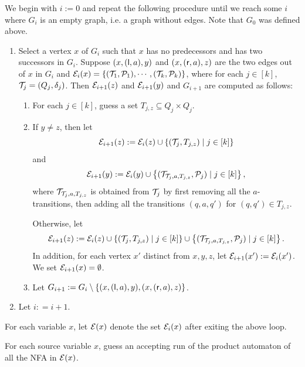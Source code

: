 We begin with $i:= 0$ and repeat the following procedure until we reach some $i$ where $G_i$ is an empty graph, i.e. a graph without edges.
Note that $G_0$ was defined above.
\begin{enumerate}
\item Select a vertex $x$ of $G_i$ such that $x$ has no predecessors  and has two successors in $G_i$. Suppose $(x, (\mathsf{l}, a), y)$ and $(x, (\mathsf{r},a), z)$ are the two edges out of $x$ in $G_i$ and $\mathcal{E}_i(x)=\{(\mathcal{T}_1,\mathcal{P}_1), \cdots, (\mathcal{T}_k, \mathcal{P}_k)\}$, where for each $j \in [k]$, $\mathcal{T}_j = (Q_j, \delta_j)$. Then $\mathcal{E}_{i+1}(z)$ and  $\mathcal{E}_{i+1}(y)$ and $G_{i+1}$ are computed as follows:
\begin{enumerate}
\item For each $j \in [k]$, guess a set $T_{j, z} \subseteq Q_j \times Q_j$.
%
\item If $y \neq z$, then let
$$\mathcal{E}_{i+1}(z):= \mathcal{E}_{i}(z) \cup \left\{(\mathcal{T}_j, T_{j,z}) \mid j \in [k] \right\}$$
and
$$\mathcal{E}_{i+1}(y): = \mathcal{E}_{i}(y) \cup \left\{(\mathcal{T}_{\mathcal{T}_j, a, T_{j,z}}, \mathcal{P}_j) \mid j \in [k] \right\},$$
where $\mathcal{T}_{\mathcal{T}_j, a, T_{j,z}}$ is obtained from $\mathcal{T}_j$ by first removing all the $a$-transitions, then adding all the transitions $(q, a, q')$ for $(q,q') \in T_{j,z}$.

Otherwise, let
$$\mathcal{E}_{i+1}(z):= \mathcal{E}_{i}(z) \cup \left\{(\mathcal{T}_j, T_{j,z}) \mid j \in [k] \right\} \cup \left\{(\mathcal{T}_{\mathcal{T}_j, a, T_{j,z}}, \mathcal{P}_j) \mid j \in [k] \right\}.$$
In addition, for each vertex $x'$ distinct from $x, y, z$, let $\mathcal{E}_{i+1}(x') := \mathcal{E}_i(x')$.
We set $\mathcal{E}_{i+1}(x) = \emptyset$.
%
\item Let $G_{i+1}:= G_i \setminus \{(x, (\mathsf{l}, a), y), (x, (\mathsf{r},a), z)\}$.
\end{enumerate}
%
\item Let $i: = i+1$.
\end{enumerate}

For each variable $x$, let $\mathcal{E}(x)$ denote the set $\mathcal{E}_i(x)$ after exiting the above loop.

\smallskip

For each source variable $x$, guess an accepting run of the product automaton of all the NFA in $\mathcal{E}(x)$.

\smallskip


